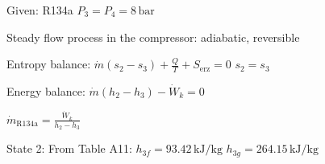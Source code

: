 Given: R134a  
\( P_3 = P_4 = 8 \, \text{bar} \)  

Steady flow process in the compressor: adiabatic, reversible  

Entropy balance:  
\( \dot{m} (s_2 - s_3) + \frac{Q}{T} + S_{\text{erz}} = 0 \)  
\( s_2 = s_3 \)  

Energy balance:  
\( \dot{m} (h_2 - h_3) - \dot{W}_k = 0 \)  

\( \dot{m}_{\text{R134a}} = \frac{\dot{W}_k}{h_2 - h_3} \)  

State 2:  
From Table A11:  
\( h_{3f} = 93.42 \, \text{kJ/kg} \)  
\( h_{3g} = 264.15 \, \text{kJ/kg} \)